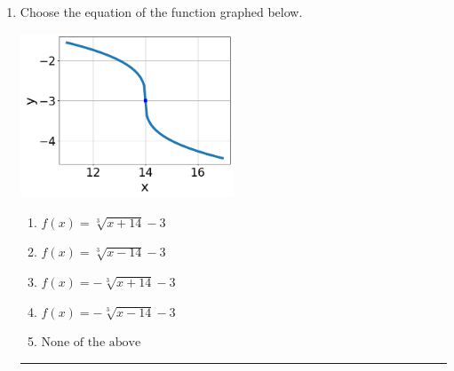 \documentclass[14pt]{extbook}
\newcommand{\litem}[1]{\item#1\hspace*{-1cm}\rule{\textwidth}{0.4pt}}
\begin{document}
\begin{enumerate}
{\begin{enumerate}[label=\Alph*.]
\end{enumerate} }
\litem{
Choose the equation of the function graphed below.
\begin{center}
    \includegraphics[width=0.5\textwidth]{../Figures/radicalGraphToEquationCopyB.png}
\end{center}
\begin{enumerate}[label=\Alph*.]
\item \( f(x) = \sqrt[3]{x + 14} - 3 \)
\item \( f(x) = \sqrt[3]{x - 14} - 3 \)
\item \( f(x) = - \sqrt[3]{x + 14} - 3 \)
\item \( f(x) = - \sqrt[3]{x - 14} - 3 \)
\item \( \text{None of the above} \)


\end{enumerate}}
\end{enumerate}
\end{document}
